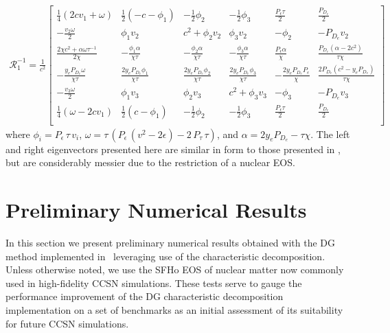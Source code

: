 \documentclass[onecolumn]{aastex62}
\begin{document}
\begin{align*}
  \mathcal{R}_{1}^{-1} = \frac{1}{c^2}
  \left[
  \begin{array}{cccccc}
   \frac{1}{4} (2 c  v_{1}+\omega ) & \frac{1}{2} (-c- \phi_{1} ) & -\frac{1}{2} \phi_{2}
    & -\frac{1}{2} \phi_{3}  & \frac{P_{\epsilon} \tau }{2} & \frac{P_{D_{e}}}{2}
     \\
   -\frac{v_{2} \omega }{2} & \phi_{1} v_{2}  & c^2+\phi_{2} v_{2}  &
     \phi_{3} v_{2}  & -\phi_{2}  & -P_{D_{e}} v_{2}
     \\
   \frac{2 \chi  c^2+\alpha  \omega \tau^{-1} }{2 \chi } & -\frac{\phi_{1} \alpha  }{\chi \tau } &
     -\frac{\phi_{2} \alpha  }{\chi \tau } & -\frac{\phi_{3} \alpha }{\chi \tau } &
     \frac{P_{\epsilon} \alpha }{\chi } & \frac{P_{D_{e}} \left(\alpha -2 c^2\right)}{\tau \chi }
      \\
   -\frac{y_{e} P_{D_{e}} \omega }{\chi \tau } & \frac{2 y_{e} P_{D_{e}} \phi_{1} }{\chi \tau } & \frac{2 y_{e} P_{D_{e}}
     \phi_{2} }{\chi \tau} & \frac{2 y_{e} P_{D_{e}} \phi_{3} }{\chi \tau} & -\frac{2 y_{e}
     P_{D_{e}} P_{\epsilon} }{\chi } & \frac{2 P_{D_{e}} \left(c^2-y_{e} P_{D_{e}} \right)}{\tau  \chi }
      \\
   -\frac{v_{3} \omega }{2} & \phi_{1} v_{3}  & \phi_{2} v_{3}   &
     c^2+\phi_{3} v_{3}  & -\phi_{3}  & -P_{D_{e}} v_{3}
      \\
   \frac{1}{4} (\omega -2 c  v_{1}) & \frac{1}{2} (c-\phi_{1} ) & -\frac{1}{2} \phi_{2}
       & -\frac{1}{2} \phi_{3}  & \frac{P_{\epsilon} \tau }{2} & \frac{P_{D_{e}}}{2}
     \\
  \end{array}
  \right]
\end{align*}
where $\phi_{i} = P_{\epsilon}\,\tau\, v_{i}$,
$\omega = \tau\, (P_{\epsilon}\,(v^2 - 2\epsilon) - 2\,P_{\tau}\,\tau)$, and
$\alpha = 2 y_{e} P_{D_{e}} - \tau \chi$.
The left and right eigenvectors presented here are similar in form to those
presented in \citet{schaal:2015a}, but are considerably messier due to the
restriction of a nuclear EOS.

\section{Preliminary Numerical Results}
\label{sec:results}
In this section we present preliminary numerical results obtained with the DG
method implemented in \thornado\, leveraging use of the characteristic
decomposition. Unless otherwise noted, we use the SFHo EOS of
nuclear matter \citep{steiner:2013} now commonly used in high-fidelity CCSN simulations.
These tests serve to gauge the performance improvement of the
DG characteristic decomposition implementation on a set of benchmarks as an initial
assessment of its suitability for future CCSN simulations.
\end{document}
